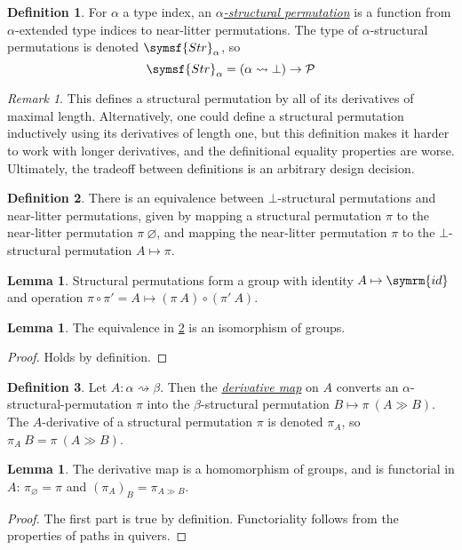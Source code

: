 \documentclass{article}
\newcommand{\cdef}[3]{\href{https://leanprover-community.github.io/con-nf/doc/ConNF/#1.html\#ConNF.#2}{\emph{#3}}}
\theoremstyle{definition}
\newtheorem{definition}{Definition}[section]
\newtheorem{lemma}[theorem]{Lemma}
\theoremstyle{remark}
\newtheorem*{remark}{Remark}
\begin{document}
\begin{definition}
    For \( \alpha \) a type index, an \cdef{Structural/StructPerm}{StructPerm}{\( \alpha \)-structural permutation} is a function from \( \alpha \)-extended type indices to near-litter permutations.
    The type of \( \alpha \)-structural permutations is denoted \( \symsf{Str}_\alpha \), so
    \[ \symsf{Str}_\alpha = (\alpha \rightsquigarrow \bot) \to \mathcal P \]
\end{definition}
\begin{remark}
    This defines a structural permutation by all of its derivatives of maximal length.
    Alternatively, one could define a structural permutation inductively using its derivatives of length one, but this definition makes it harder to work with longer derivatives, and the definitional equality properties are worse.
    Ultimately, the tradeoff between definitions is an arbitrary design decision.
\end{remark}
\begin{definition}
    \label{def:StructPerm.toBot}
    There is an equivalence between \( \bot \)-structural permutations and near-litter permutations, given by mapping a structural permutation \( \pi \) to the near-litter permutation \( \pi\ \varnothing \), and mapping the near-litter permutation \( \pi \) to the \( \bot \)-structural permutation \( A \mapsto \pi \).
\end{definition}
\begin{lemma}
    Structural permutations form a group with identity \( A \mapsto \symrm{id} \) and operation \( \pi \circ \pi' = A \mapsto (\pi\ A) \circ (\pi'\ A) \).
\end{lemma}
\begin{lemma}
    The equivalence in \cref{def:StructPerm.toBot} is an isomorphism of groups.
\end{lemma}
\begin{proof}
    Holds by definition.
\end{proof}
\begin{definition}
    Let \( A : \alpha \rightsquigarrow \beta \).
    Then the \cdef{Structural/StructPerm}{StructPerm.derivative}{derivative map} on \( A \) converts an \( \alpha \)-structural-permutation \( \pi \) into the \( \beta \)-structural permutation \( B \mapsto \pi\ (A \gg B) \).
    The \( A \)-derivative of a structural permutation \( \pi \) is denoted \( \pi_A \), so \( \pi_A\ B = \pi\ (A \gg B) \).
\end{definition}
\begin{lemma}
    The derivative map is a homomorphism of groups, and is functorial in \( A \): \( \pi_\varnothing = \pi \) and \( (\pi_A)_B = \pi_{A \gg B} \).
\end{lemma}
\begin{proof}
    The first part is true by definition.
    Functoriality follows from the properties of paths in quivers.
\end{proof}
\end{document}
